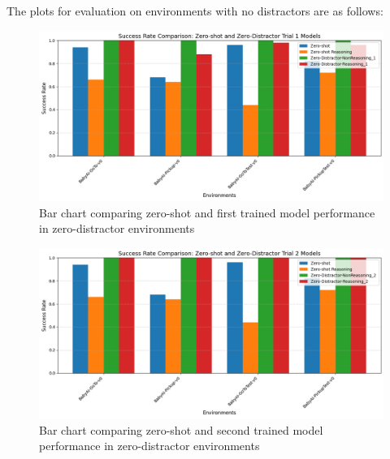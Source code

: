 \documentclass[11pt,a4paper]{article}
\begin{document}
The plots for evaluation on environments with no distractors are as follows:
\begin{figure}[H]
    \centering
    \includegraphics[width=1\linewidth]
    {../images/0-distractor-trial-1}
    \caption{Bar chart comparing zero-shot and first trained model performance in zero-distractor environments}
\end{figure}
\begin{figure}[H]
    \centering
    \includegraphics[width=1\linewidth]
    {../images/0-distractor-trial-2}
    \caption{Bar chart comparing zero-shot and second trained model performance in zero-distractor environments}
\end{figure}
\end{document}
